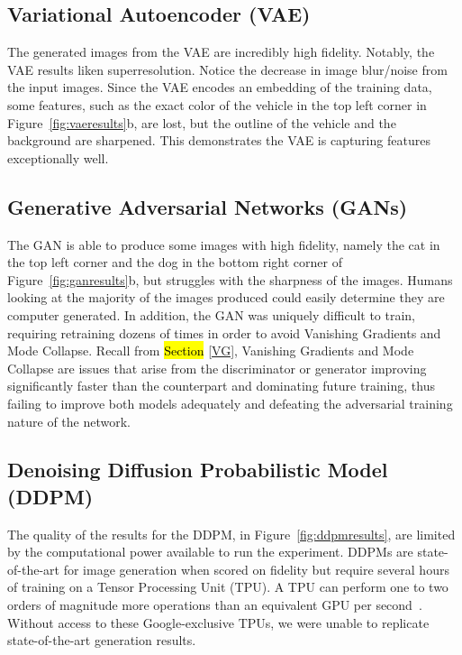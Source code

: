 \documentclass[technologies,article,accept,pdftex,moreauthors]{Definitions/mdpi}
\newcommand{\figref}[1]{Figure~\ref{#1}}
\begin{document}
\subsection{Variational Autoencoder (VAE)}
The generated images from the VAE are incredibly high fidelity. Notably, the VAE results liken superresolution. Notice the decrease in image blur/noise from the input images. Since the VAE encodes an embedding of the training data, some features, such as the exact color of the vehicle in the top left corner in \figref{fig:vaeresults}b, are lost, but the outline of the vehicle and the background are sharpened. This demonstrates the VAE is capturing features exceptionally well.

\subsection{Generative Adversarial Networks (GANs)}

The GAN is able to produce some images with high fidelity, namely the cat in the top left corner and the dog in the bottom right corner of \figref{fig:ganresults}b, but struggles with the sharpness of the images. Humans looking at the majority of the images produced could easily determine they are computer generated. In addition, the GAN was uniquely difficult to train, requiring retraining dozens of times in order to avoid Vanishing Gradients and Mode Collapse. Recall from \hl{Section} %
 \ref{VG}, Vanishing Gradients and Mode Collapse are issues that arise from the discriminator or generator improving significantly faster than the counterpart and dominating future training, thus failing to improve both models adequately and defeating the adversarial training nature of the network.

\subsection{Denoising Diffusion Probabilistic Model (DDPM)}
\label{ddpm_result_}
The quality of the results for the DDPM, in \figref{fig:ddpmresults}, are limited by the computational power available to run the experiment. DDPMs are state-of-the-art for image generation when scored on fidelity but require several hours of training on a Tensor Processing Unit (TPU). A TPU can perform one to two orders of magnitude more operations than an equivalent GPU per second~\cite{googlecloud}. Without access to these Google-exclusive TPUs, we were unable to replicate state-of-the-art generation results.
\end{document}
